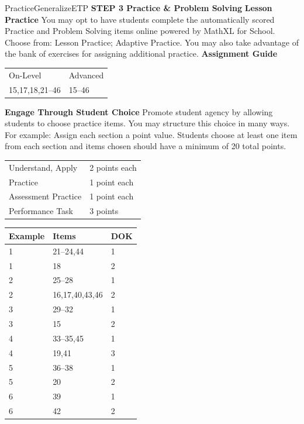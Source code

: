 \documentclass{article}
\newenvironment{item-analysis}{}{}      %
\newenvironment{te-addendum}[2]{}{}     %
\newcommand{\te}[1]{}                   %
\begin{document}
\begin{te-addendum}{Practice}{GeneralizeETP}
\textbf{STEP 3 Practice \& Problem Solving}
\textbf{Lesson Practice} You may opt to have students complete the automatically scored Practice and Problem Solving items online powered by MathXL for School.
Choose from: Lesson Practice; Adaptive Practice.
You may also take advantage of the bank of exercises for assigning additional practice.
\textbf{Assignment Guide}
\begin{tabular}{ll}
On-Level & Advanced \\
15,17,18,21--46 & 15--46 \\
\end{tabular}
\textbf{Engage Through Student Choice}
Promote student agency by allowing students to choose practice items. You may structure this choice in many ways. For example:
Assign each section a point value. Students choose at least one item from each section and items chosen should have a minimum of 20 total points.
\begin{tabular}{ll}
Understand, Apply & 2 points each \\
Practice & 1 point each \\
Assessment Practice & 1 point each \\
Performance Task & 3 points \\
\end{tabular}
\te{Practice \& Problem Solving and video tutorials are available at SavvasRealize.com. Scan the QR code to access a video tutorial.}
\end{te-addendum}
\begin{item-analysis}
\begin{tabular}{lll}
\toprule
Example & Items & DOK \\
\midrule
1 & 21--24,44 & 1 \\
1 & 18 & 2 \\
2 & 25--28 & 1 \\
2 & 16,17,40,43,46 & 2 \\
3 & 29--32 & 1 \\
3 & 15 & 2 \\
4 & 33--35,45 & 1 \\
4 & 19,41 & 3 \\
5 & 36--38 & 1 \\
5 & 20 & 2 \\
6 & 39 & 1 \\
6 & 42 & 2 \\
\bottomrule
\end{tabular}
\end{item-analysis}
\end{document}
